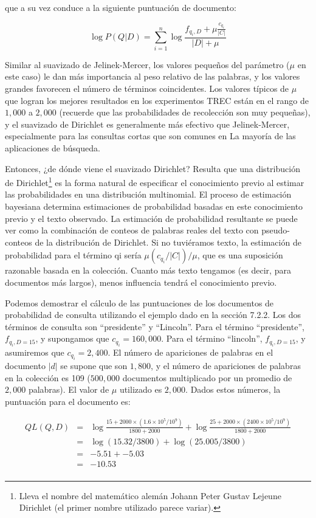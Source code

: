 que a su vez conduce a la siguiente puntuación de documento:

$$\log{P(Q|D)} = \sum_{i=1}^{n}\log{\frac{f_{q_i,D} + \mu\frac{c_{q_i}}{|C|}}{|D| + \mu}}$$

Similar al suavizado de Jelinek-Mercer, los valores pequeños del parámetro ($\mu$ en este caso) le dan más importancia al peso relativo de las palabras, y los valores grandes favorecen el número de términos coincidentes. Los valores típicos de $\mu$ que logran los mejores resultados en los experimentos TREC están en el rango de $1,000$ a $2,000$ (recuerde que las probabilidades de recolección son muy pequeñas), y el suavizado de Dirichlet es generalmente más efectivo que Jelinek-Mercer, especialmente para las consultas cortas que son comunes en La mayoría de las aplicaciones de búsqueda.

Entonces, ¿de dónde viene el suavizado Dirichlet? Resulta que una distribución de Dirichlet\footnote{Lleva el nombre del matemático alemán Johann Peter Gustav Lejeune Dirichlet (el primer nombre utilizado parece variar).} es la forma natural de especificar el conocimiento previo al estimar las probabilidades en una distribución multinomial. El proceso de estimación bayesiana determina estimaciones de probabilidad basadas en este conocimiento previo y el texto observado. La estimación de probabilidad resultante se puede ver como la combinación de conteos de palabras reales del texto con pseudo-conteos de la distribución de Dirichlet. Si no tuviéramos texto, la estimación de probabilidad para el término qi sería $\mu (c_{q_i} / | C |) / \mu$, que es una suposición razonable basada en la colección. Cuanto más texto tengamos (es decir, para documentos más largos), menos influencia tendrá el conocimiento previo.

Podemos demostrar el cálculo de las puntuaciones de los documentos de probabilidad de consulta utilizando el ejemplo dado en la sección 7.2.2. Los dos términos de consulta son ``presidente'' y ``Lincoln''. Para el término ``presidente'', $f_{q_{i}, D = 15}$, y supongamos que $c_{q_i} = 160,000$. Para el término ``lincoln'', $f_{q_{i}, D = 15}$, y asumiremos que $c_{q_i} = 2,400$. El número de apariciones de palabras en el documento $| d |$ se supone que son $1,800$, y el número de apariciones de palabras en la colección es 109 ($500,000$ documentos multiplicado por un promedio de $2,000$ palabras). El valor de $\mu$ utilizado es $2,000$. Dados estos números, la puntuación para el documento es:

$$
\begin{array}{lll}
	QL(Q,D) & = & \log{\frac{15 + 2000 \times (1.6 \times 10^5/10^9)}{1800 + 2000}} + \log{\frac{25 + 2000 \times (2400 \times 10^5/10^9)}{1800 + 2000}}\\
	        & = &  \log{(15.32/3800)} + \log{(25.005/3800)}\\
	        & = &  -5.51 +-5.03\\
	        & = &  -10.53\\
\end{array}
$$

